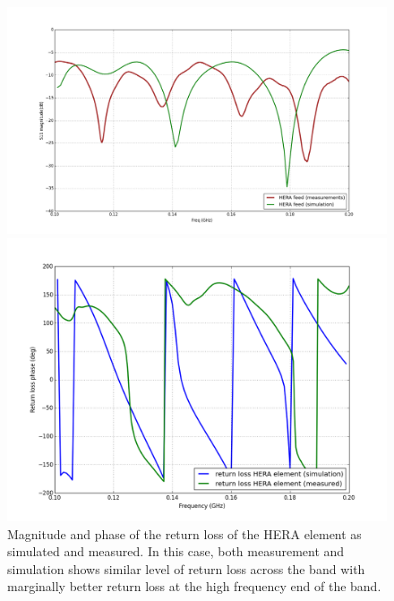 \documentclass[twocolumn]{emulateapj}
\begin{document}
\begin{figure}[ht]
\begin{minipage}[b]{\linewidth}
\centering
\includegraphics[angle=0, width=\linewidth]{GB_reflectometry_part3/plot/RL_mag_dish.png}
\end{minipage}
\vspace{0.1cm}
\begin{minipage}[b]{\linewidth}
\centering
\includegraphics[angle=0, width=\linewidth]{plots/HERA_meas_sim_ph.png}
\end{minipage}
\caption{Magnitude and phase of the return loss of the HERA element as simulated and measured. In this case, both measurement and simulation shows similar level of return loss across the band with marginally better return loss at the high frequency end of the band. }   
\label{RL_mag_dish}
\end{figure}
\end{document}
